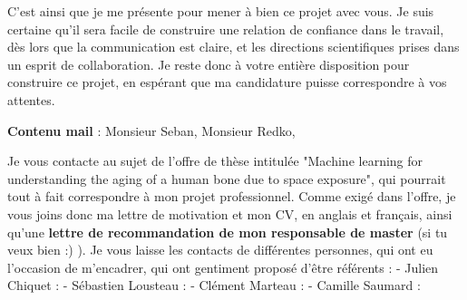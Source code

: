 \documentclass[a4paper,12pt]{article}
\begin{document}
C'est ainsi que je me présente pour mener à bien ce projet avec vous. Je suis certaine qu'il sera facile de construire une relation de confiance dans le travail, dès lors que la communication est claire, et les directions scientifiques prises dans un esprit de collaboration. Je reste donc à votre entière disposition pour construire ce projet, en espérant que ma candidature puisse correspondre à vos attentes. 

    


\hspace{3cm}

\textbf{Contenu mail} : Monsieur Seban, Monsieur Redko, 

Je vous contacte au sujet de l'offre de thèse intitulée "Machine learning for understanding the aging of a human bone due to space exposure", qui pourrait tout à fait correspondre à mon projet professionnel. Comme exigé dans l'offre, je vous joins donc ma lettre de motivation et mon CV, en anglais et français, ainsi qu'une \textbf{lettre de recommandation de mon responsable de master} (si tu veux bien :) ).%
Je vous laisse les contacts de différentes personnes, qui ont eu l'occasion de m'encadrer, qui ont gentiment proposé d'être référents : 
- Julien Chiquet : 
- Sébastien Lousteau :
- Clément Marteau : 
- Camille Saumard : 
\end{document}
